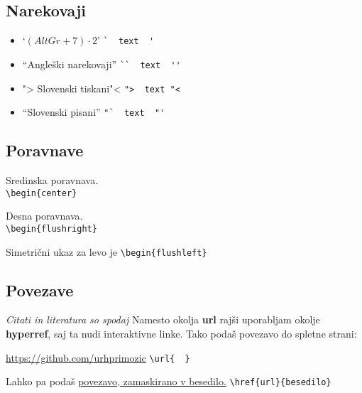 \documentclass[a4paper, 12pt]{article}
\newcommand{\tx}{\hspace*{0pt}\hfill\verb}
\begin{document}
    \subsection{Narekovaji}
    \begin{itemize}
        \item `$({AltGr}+7)\cdot2$' \tx|`  text  '|
        \item ``Angleški narekovaji'' \tx|``  text  ''|
        \item  "> Slovenski tiskani"< \tx|">  text "<|
        \item "`Slovenski pisani"' \tx|"`  text  "'|
    \end{itemize}
    \subsection{Poravnave}
    \begin{center}
        Sredinska poravnava.\\
        \verb|\begin{center}|
    \end{center}
    \begin{flushright}
        Desna poravnava.\\
        \verb|\begin{flushright}|\\
        \end{flushright}
        \begin{flushleft}
                Simetrični ukaz za levo je \verb|\begin{flushleft}|
        \end{flushleft}
    \subsection{Povezave}
    \emph{Citati in literatura so spodaj}
        Namesto okolja \textbf{url} rajši uporabljam okolje \textbf{hyperref}, saj ta nudi interaktivne linke.
        Tako podaš povezavo do spletne strani:
        \begin{center}
            \url{https://github.com/urhprimozic} \tx|\url{  }|
        \end{center}
        Lahko pa podaš \href{https://github.com/urhprimozic}{povezavo, zamaskirano v besedilo.} \tx|\href{url}{besedilo}|
\end{document}
